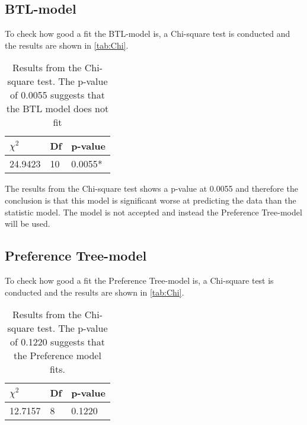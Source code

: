 \subsection*{BTL-model}
To check how good a fit the BTL-model is, a Chi-square test is conducted and the results are shown in \autoref{tab:Chi}. 
%
\begin{table}[H]
\centering
\begin{tabular}{@{}lll@{}}
\toprule
$\chi^{2}$   & Df  & p-value \\ \midrule
24.9423      & 10  & 0.0055* \\ \bottomrule
\end{tabular}
\caption{Results from the Chi-square test. The p-value of 0.0055 suggests that the BTL model does not fit}
\label{tab:Chi}
\end{table} 
\noindent 
The results from the Chi-square test shows a p-value at 0.0055 and therefore the conclusion is that this model is significant worse at predicting the data than the statistic model. The model is not accepted and instead the Preference Tree-model will be used. 

\subsection*{Preference Tree-model}


To check how good a fit the Preference Tree-model is, a Chi-square test is conducted and the results are shown in \autoref{tab:Chi}. 
%
\begin{table}[H]
\centering
\begin{tabular}{@{}lll@{}}
\toprule
$\chi^{2}$   & Df  & p-value \\ \midrule
12.7157      & 8   & 0.1220  \\ \bottomrule
\end{tabular}
\caption{Results from the Chi-square test. The p-value of 0.1220 suggests that the Preference model fits.}
\label{tab:Chi}
\end{table} 
\vfill
